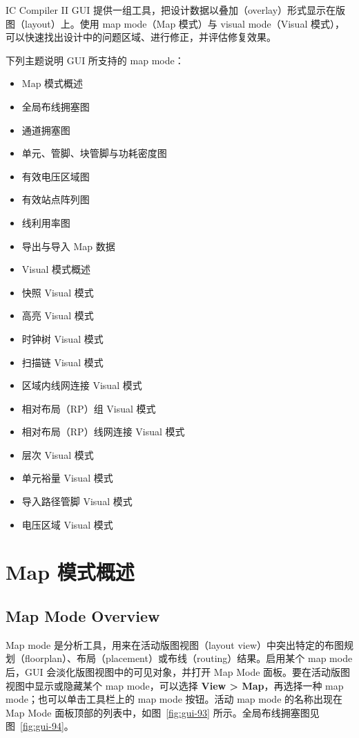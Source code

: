 \label{chap:gui-map}

IC Compiler II GUI 提供一组工具，把设计数据以叠加（overlay）形式显示在版图（layout）上。使用 map mode（Map 模式）与 visual mode（Visual 模式），可以快速找出设计中的问题区域、进行修正，并评估修复效果。

下列主题说明 GUI 所支持的 map mode：
\begin{itemize}
  \item Map 模式概述
  \item 全局布线拥塞图
  \item 通道拥塞图
  \item 单元、管脚、块管脚与功耗密度图
  \item 有效电压区域图
  \item 有效站点阵列图
  \item 线利用率图
  \item 导出与导入 Map 数据
  \item Visual 模式概述
  \item 快照 Visual 模式
  \item 高亮 Visual 模式
  \item 时钟树 Visual 模式
  \item 扫描链 Visual 模式
  \item 区域内线网连接 Visual 模式
  \item 相对布局（RP）组 Visual 模式
  \item 相对布局（RP）线网连接 Visual 模式
  \item 层次 Visual 模式
  \item 单元裕量 Visual 模式
  \item 导入路径管脚 Visual 模式
  \item 电压区域 Visual 模式
\end{itemize}

\section{Map 模式概述}
\subsection*{Map Mode Overview}

Map mode 是分析工具，用来在活动版图视图（layout view）中突出特定的布图规划（floorplan）、布局（placement）或布线（routing）结果。启用某个 map mode 后，GUI 会淡化版图视图中的可见对象，并打开 Map Mode 面板。要在活动版图视图中显示或隐藏某个 map mode，可以选择 \textbf{View > Map}，再选择一种 map mode；也可以单击工具栏上的 map mode 按钮。活动 map mode 的名称出现在 Map Mode 面板顶部的列表中，如图~\ref{fig:gui-93} 所示。全局布线拥塞图见图~\ref{fig:gui-94}。

